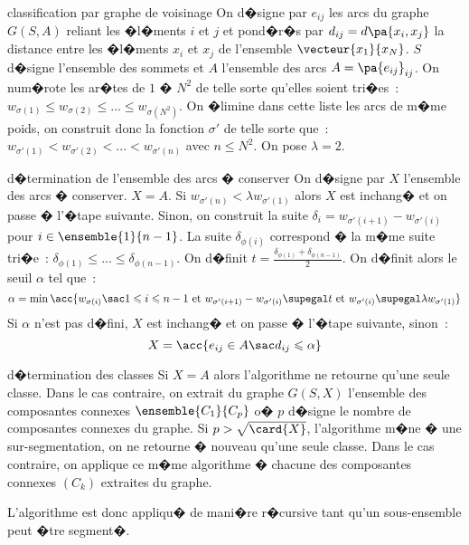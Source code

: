         \begin{xalgorithm}{classification par graphe de voisinage}
        \label{classification_graphe_band}
        On d�signe par $e_{ij}$ les arcs du graphe $G(S,A)$ 
        reliant les �l�ments $i$ et $j$ et pond�r�s par $d_{ij} = d\pa{x_i,x_j}$ la distance
        entre les �l�ments $x_i$ et $x_j$ de l'ensemble $\vecteur{x_1}{x_N}$. $S$ d�signe l'ensemble
        des sommets et $A$ l'ensemble des arcs $A = \pa{e_{ij}}_{ij}$. 
        On num�rote les ar�tes de $1$
        � $N^2$ de telle sorte qu'elles soient tri�es~: $w_{\sigma(1)} \leqslant w_{\sigma(2)} \leqslant ... \leqslant
        w_{\sigma(N^2)}$. On �limine dans cette liste les arcs de m�me poids, on construit donc la fonction $\sigma'$
        de telle sorte que~: $w_{\sigma'(1)} < w_{\sigma'(2)} < ... < w_{\sigma'(n)}$ avec $n \leqslant N^2$. On pose
        $\lambda = 2$.
        
        \begin{xalgostep}{d�termination de l'ensemble des arcs � conserver}
        On d�signe par $X$ l'ensemble des arcs � conserver. $X = A$. Si $w_{\sigma'(n)} < \lambda w_{\sigma'(1)}$ alors $X$
        est inchang� et on passe � l'�tape suivante. Sinon, on construit la suite 
        $\delta_i = w_{\sigma'(i+1)} - w_{\sigma'(i)}$ pour $i \in \ensemble{1}{n-1}$. La suite $\delta_{\phi(i)}$
        correspond � la m�me suite tri�e~: $\delta_{\phi(1)} \leqslant  ... \leqslant \delta_{\phi(n-1)}$. On d�finit 
        $t = \frac{\delta_{\phi(1)} + \delta_{\phi(n-1)}} {2}$. On d�finit alors le seuil $\alpha$ tel que~:
                    $$
                    \alpha = \min \acc{ w_{\sigma(i)} \sac
                                                            1 \leqslant i \leqslant n-1 \text{ et } 
                                                            w_{\sigma'(i+1)} - w_{\sigma'(i)} \supegal t \text{ et }
                                                            w_{\sigma'(i)} \supegal \lambda w_{\sigma'(1)}}
                    $$
        Si $\alpha$ n'est pas d�fini, $X$ est inchang� et on passe � l'�tape suivante, sinon~:
                    $$
                    X = \acc{ e_{ij} \in A \sac d_{ij} \leqslant \alpha}
                    $$
        \end{xalgostep}
        
        \begin{xalgostep}{d�termination des classes}
        Si $X = A$ alors l'algorithme ne retourne qu'une seule classe. Dans le cas contraire,
        on extrait du graphe $G(S,X)$ l'ensemble des composantes connexes $\ensemble{C_1}{C_p}$ o�
        $p$ d�signe le nombre de composantes connexes du graphe.
        Si $p > \sqrt{ \card{X}}$, l'algorithme m�ne � une sur-segmentation, on ne retourne � nouveau qu'une seule
        classe. Dans le cas contraire, on applique ce m�me algorithme � chacune des composantes connexes $(C_k)$
        extraites du graphe. 
        \end{xalgostep}
        
        L'algorithme est donc appliqu� de mani�re r�cursive tant qu'un sous-ensemble
        peut �tre segment�.
        \end{xalgorithm}



